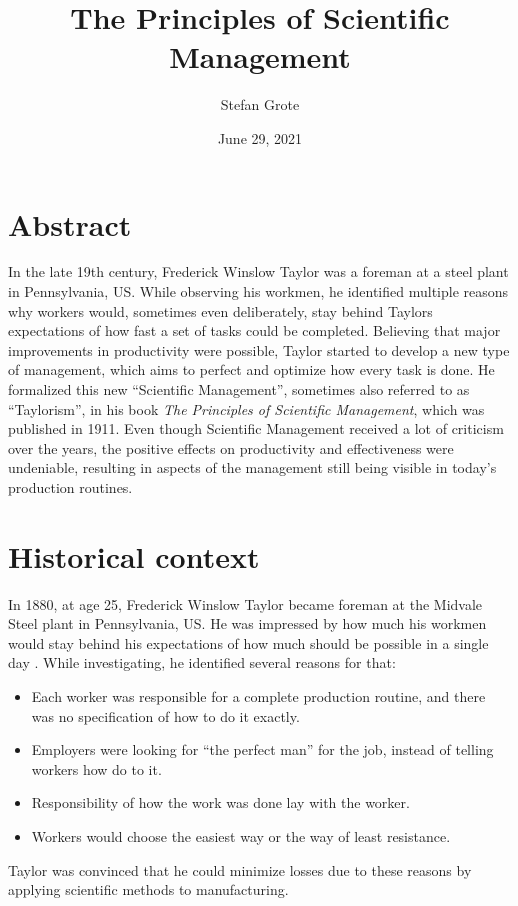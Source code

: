 \documentclass[a4paper,11pt]{article}
\title{The Principles of Scientific Management}
\author{Stefan Grote}
\date{June 29, 2021}
\newcommand{\enquote}[1]{``#1''}
\begin{document}
\maketitle

\section{Abstract}
In the late 19th century, Frederick Winslow Taylor was a foreman at a steel
plant in Pennsylvania, US. While observing his workmen, he identified multiple
reasons why workers would, sometimes even deliberately, stay behind Taylors
expectations of how fast a set of tasks could be completed. Believing that
major improvements in productivity were possible, Taylor started to develop a
new type of management, which aims to perfect and optimize how every task is
done. He formalized this new \enquote{Scientific Management}, sometimes also
referred to as \enquote{Taylorism}, in his book \textit{The Principles of
  Scientific Management}, which was published in 1911. Even though Scientific
Management received a lot of criticism over the years, the positive effects on
productivity and effectiveness were undeniable, resulting in aspects of the
management still being visible in today's production routines.

\section{Historical context}
In 1880, at age 25, Frederick Winslow Taylor became foreman at the Midvale
Steel plant in Pennsylvania, US. He was impressed by how much his workmen
would stay behind his expectations of how much should be possible in a single
day \cite{wikipedia}. While investigating, he identified several reasons for
that:
\begin{itemize}
\item Each worker was responsible for a complete production routine, and there
  was no specification of how to do it exactly.
\item Employers were looking for \enquote{the perfect man} for the job,
  instead of telling workers how do to it.
\item Responsibility of how the work was done lay with the worker.
\item Workers would choose the easiest way or the way of least resistance.
\end{itemize}
Taylor was convinced that he could minimize losses due to these reasons by
applying scientific methods to manufacturing.
\end{document}
